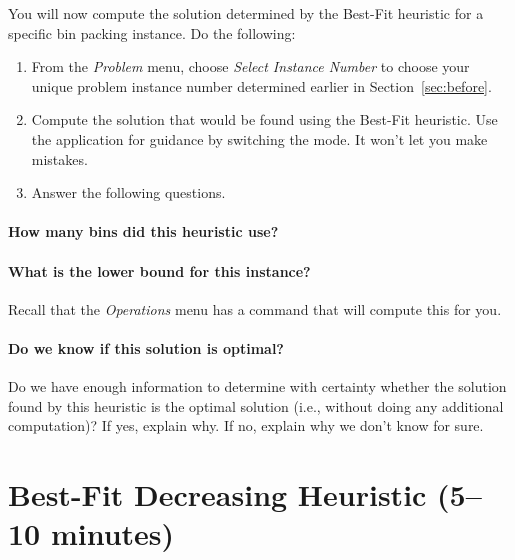 \documentclass[11pt,letterpaper]{article}
\begin{document}
You will now compute the solution determined by the Best-Fit
heuristic for a specific bin packing instance. Do the following:
\begin{enumerate}[leftmargin=*, parsep=0pt, itemsep=2pt, topsep=2pt, partopsep=0pt]
\item From the {\em Problem} menu, choose {\em Select Instance Number}
to choose your unique problem instance number determined earlier in 
Section~\ref{sec:before}.
\item Compute the solution that would be found using the Best-Fit 
heuristic. Use the application for guidance by switching the mode.
It won't let you make mistakes.
\item Answer the following questions.
\end{enumerate}

\vspace*{-0.25in}

\paragraph*{How many bins did this heuristic use?}

\vspace*{0.25in}

\paragraph*{What is the lower bound for this instance?} Recall that the
{\em Operations} menu has a command that will compute this for you.

\vspace*{0.25in}

\paragraph*{Do we know if this solution is optimal?} Do we have enough 
information to determine with certainty whether the solution found by
this heuristic is the optimal solution (i.e., without doing any additional
computation)? If yes, explain why. If no, explain why we don't know for sure.

\vspace*{0.5in}



\section{Best-Fit Decreasing Heuristic (5--10 minutes)}\label{sec:bfd}
\end{document}
